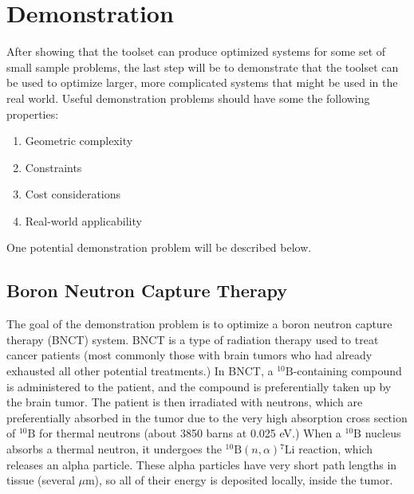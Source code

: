 \section{Demonstration}
\label{sec:proposal:demonstration}

After showing that the toolset can produce optimized systems for some set of small sample problems, the last step will be to demonstrate that the toolset can be used to optimize larger, more complicated systems that might be used in the real world.
Useful demonstration problems should have some the following properties:
\begin{enumerate}
  \item Geometric complexity
  \item Constraints
  \item Cost considerations
  \item Real-world applicability
\end{enumerate}
One potential demonstration problem will be described below.

\subsection{Boron Neutron Capture Therapy}
\label{sec:proposal:bnct}

The goal of the demonstration problem is to optimize a boron neutron capture therapy (BNCT) system.
BNCT is a type of radiation therapy used to treat cancer patients (most commonly those with brain tumors who had already exhausted all other potential treatments.)
In BNCT, a ${}^{10}\text{B}$-containing compound is administered to the patient, and the compound is preferentially taken up by the brain tumor.
The patient is then irradiated with neutrons, which are preferentially absorbed in the tumor due to the very high absorption cross section of ${}^{10}\text{B}$ for thermal neutrons (about 3850 barns at 0.025 eV.)
When a ${}^{10}\text{B}$ nucleus absorbs a thermal neutron, it undergoes the ${}^{10}\text{B}\left(n,\alpha\right){}^{7}\text{Li}$ reaction, which releases an alpha particle.
These alpha particles have very short path lengths in tissue (several $\mu$m), so all of their energy is deposited locally, inside the tumor.

